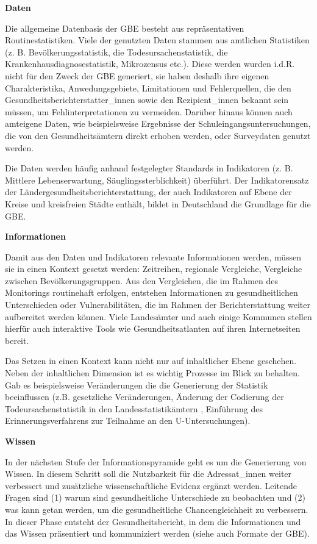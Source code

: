 \documentclass{article}
\begin{document}
\textbf{Daten}


Die allgemeine Datenbasis der GBE besteht aus repräsentativen Routinestatistiken. Viele der genutzten Daten stammen aus amtlichen Statistiken (z. B.  Bevölkerungsstatistik, die Todesursachenstatistik, die Krankenhausdiagnosestatistik, Mikrozensus etc.). Diese werden wurden i.d.R. nicht für den Zweck der GBE generiert, sie haben deshalb ihre eigenen Charakteristika, Anwedungsgebiete, Limitationen und Fehlerquellen, die den Gesundheitsberichterstatter\_innen sowie den Rezipient\_innen bekannt sein müssen, um Fehlinterpretationen zu vermeiden. Darüber hinaus können auch amteigene Daten, wie beispielsweise Ergebnisse der Schuleingangsuntersuchungen, die von den Gesundheitsämtern direkt erhoben werden, oder Surveydaten genutzt werden. 


Die Daten werden häufig anhand festgelegter Standards in Indikatoren (z. B. Mittlere Lebenserwartung, Säuglingssterblichkeit) überführt. Der Indikatorensatz der Ländergesundheitsberichterstattung, der auch Indikatoren auf Ebene der Kreise und kreisfreien Städte enthält, bildet in Deutschland die Grundlage für die GBE. 


\textbf{Informationen}


Damit aus den Daten und Indikatoren relevante Informationen werden, müssen sie in einen Kontext gesetzt werden: Zeitreihen, regionale Vergleiche, Vergleiche zwischen Bevölkerungsgruppen. Aus den Vergleichen, die im Rahmen des Monitorings routinehaft erfolgen, entstehen Informationen zu gesundheitlichen Unterschieden oder Vulnerabilitäten, die im Rahmen der Berichterstattung weiter aufbereitet werden können. Viele Landesämter und auch einige Kommunen stellen hierfür auch interaktive Tools wie Gesundheitsatlanten auf ihren Internetseiten bereit.


Das Setzen in einen Kontext kann nicht nur auf inhaltlicher Ebene geschehen. Neben der inhaltlichen Dimension ist es wichtig Prozesse im Blick zu behalten. Gab es beispielsweise Veränderungen die die Generierung der Statistik beeinflussen (z.B. gesetzliche Veränderungen, Änderung der Codierung der Todeursachenstatistik in den Landesstatistikämtern \autocite{EckertOlafundweitere2018}, Einführung des Erinnerungsverfahrens zur Teilnahme an den U-Untersuchungen).


\textbf{Wissen}


In der nächsten Stufe der Informationspyramide geht es um die Generierung von Wissen. In diesem Schritt soll die Nutzbarkeit für die Adressat\_innen weiter  verbessert und zusätzliche wissenschaftliche Evidenz ergänzt werden. Leitende Fragen sind (1) warum sind gesundheitliche Unterschiede zu beobachten und (2) was kann getan werden, um die gesundheitliche Chancengleichheit zu verbessern. In dieser Phase entsteht der Gesundheitsbericht, in dem die Informationen und das Wissen präsentiert und kommuniziert werden (siehe auch Formate der GBE). 
\end{document}
